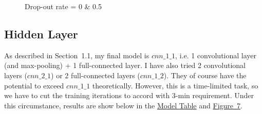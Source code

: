 \documentclass{article}
\begin{document}
\begin{figure}
	\centering
	\caption{Drop-out rate = 0 \& 0.5}
	\label{fig-6}
\end{figure}


\subsection{Hidden Layer}
As described in Section~1.1, my final model is $cnn\_1\_1$, i.e. 1 convolutional layer (and max-pooling) + 1 full-connected layer. I have also tried 2 convolutional layers ($cnn\_2\_1$) or 2 full-connected layers ($cnn\_1\_2$). They of course have the potential to exceed $cnn\_1\_1$ theoretically. However, this is a time-limited task, so we have to cut the training iterations to accord with 3-min requirement. Under this circumstance, results are show below in the \hyperref[tab-6]{Model Table} and \hyperref[fig-7]{Figure~7}.
\end{document}
